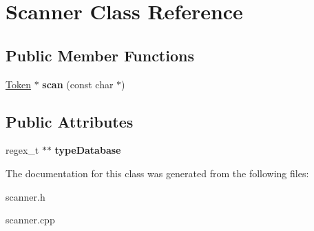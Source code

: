 \hypertarget{classScanner}{\section{Scanner Class Reference}
\label{classScanner}
}
\subsection*{Public Member Functions}
\begin{DoxyCompactItemize}
\item 
\hypertarget{classScanner_a4cf90c9e68bfb17f23af7368ff15766e}{\hyperlink{classToken}{Token} $\ast$ {\bfseries scan} (const char $\ast$)}\label{classScanner_a4cf90c9e68bfb17f23af7368ff15766e}

\end{DoxyCompactItemize}
\subsection*{Public Attributes}
\begin{DoxyCompactItemize}
\item 
\hypertarget{classScanner_abff69d92b8f5d9112d5af0d106fd42ed}{regex\-\_\-t $\ast$$\ast$ {\bfseries type\-Database}}\label{classScanner_abff69d92b8f5d9112d5af0d106fd42ed}

\end{DoxyCompactItemize}


The documentation for this class was generated from the following files\-:\begin{DoxyCompactItemize}
\item 
scanner.\-h\item 
scanner.\-cpp\end{DoxyCompactItemize}
